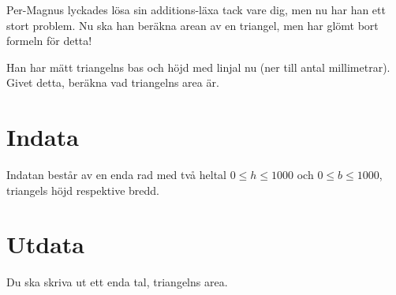 
Per-Magnus lyckades lösa sin additions-läxa tack vare dig, men nu har han ett stort problem. Nu ska han beräkna arean av en triangel, men har glömt bort formeln för detta!

Han har mätt triangelns bas och höjd med linjal nu (ner till antal millimetrar). Givet detta, beräkna vad triangelns area är.

\section*{Indata}

Indatan består av en enda rad med två heltal $0 \le h \le 1000$ och $0 \le b \le 1000$, triangels höjd respektive bredd.

\section*{Utdata}

Du ska skriva ut ett enda tal, triangelns area.
